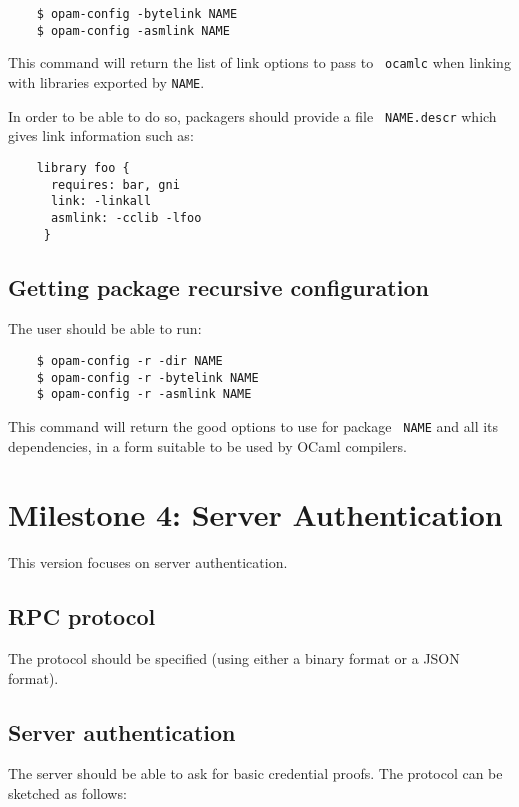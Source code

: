 \documentclass[a4paper,11pt]{article}
\begin{document}
\begin{itemize}
\begin{verbatim}
    $ opam-config -bytelink NAME
    $ opam-config -asmlink NAME
\end{verbatim}

This command will return the list of link options to pass to {\tt
  ocamlc} when linking with libraries exported by {\tt NAME}.

In order to be able to do so, packagers should provide a file {\tt
  NAME.descr} which gives link information such as:

\begin{verbatim}
    library foo {
      requires: bar, gni
      link: -linkall
      asmlink: -cclib -lfoo
     }
\end{verbatim}

\subsection{Getting package recursive configuration}

The user should be able to run:

\begin{verbatim}
    $ opam-config -r -dir NAME
    $ opam-config -r -bytelink NAME
    $ opam-config -r -asmlink NAME
\end{verbatim}

This command will return the good options to use for package {\tt
  NAME} and all its dependencies, in a form suitable to be used by
OCaml compilers.

\section{Milestone 4: Server Authentication}

This version focuses on server authentication.

\subsection{RPC protocol}

The protocol should be specified (using either a binary format or a
JSON format).

\subsection{Server authentication}

The server should be able to ask for basic credential proofs. The
protocol can be sketched as follows:


\end{itemize}
\end{document}
